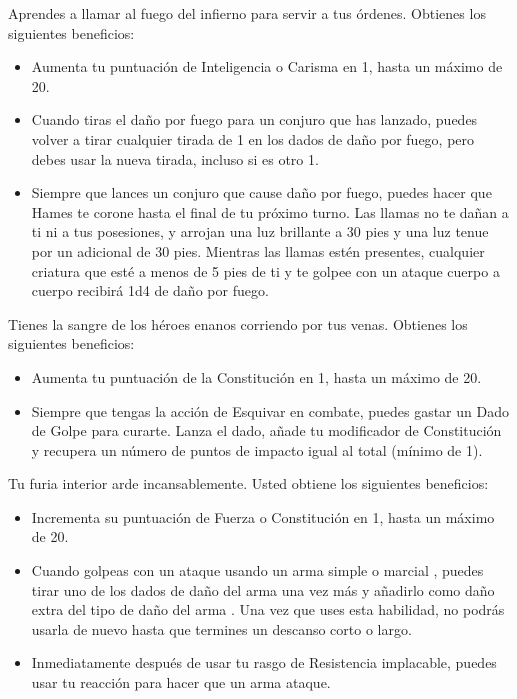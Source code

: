 \documentclass[a4paper,twocolumn,openany,10pt]{dndbook}
\begin{document}
Aprendes a llamar al fuego del infierno para servir a tus órdenes. Obtienes los siguientes beneficios:
\begin{itemize}
\item Aumenta tu puntuación de Inteligencia o Carisma en 1, hasta un máximo de 20.
\item Cuando tiras el daño por fuego para un conjuro que has lanzado, puedes volver a tirar cualquier tirada de 1 en los dados
de daño por fuego, pero debes usar la nueva tirada, incluso si es otro 1.
\item Siempre que lances un conjuro que cause daño por fuego, puedes hacer que Hames te corone hasta el final de tu próximo
turno. Las llamas no te dañan a ti ni a tus posesiones, y arrojan una luz brillante a 30 pies y una luz tenue por un adicional
de 30 pies. Mientras las llamas estén presentes, cualquier criatura que esté a menos de 5 pies de ti y te golpee con un ataque
cuerpo a cuerpo recibirá 1d4 de daño por fuego.
\end{itemize}

Tienes la sangre de los héroes enanos corriendo por tus venas. Obtienes los siguientes beneficios:
\begin{itemize}
\item Aumenta tu puntuación de la Constitución en 1, hasta un máximo de 20.
\item Siempre que tengas la acción de Esquivar en combate, puedes gastar un Dado de Golpe para curarte. Lanza el dado, añade tu
modificador de Constitución y recupera un número de puntos de impacto igual al total (mínimo de 1).
\end{itemize}

Tu furia interior arde incansablemente. Usted obtiene los siguientes beneficios:
\begin{itemize}
\item Incrementa su puntuación de Fuerza o Constitución en 1, hasta un máximo de 20.
\item Cuando golpeas con un ataque usando un arma simple o marcial , puedes tirar uno de los dados de daño del arma una vez más
y añadirlo como daño extra del tipo de daño del arma . Una vez que uses esta habilidad, no podrás usarla de nuevo hasta que
termines un descanso corto o largo.
\item Inmediatamente después de usar tu rasgo de Resistencia implacable, puedes usar tu reacción para hacer que un arma ataque.
\end{itemize}
\end{document}
